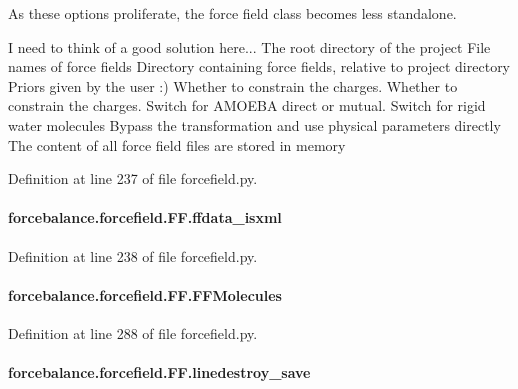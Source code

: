 As these options proliferate, the force field class becomes less standalone. 

I need to think of a good solution here... The root directory of the project File names of force fields Directory containing force fields, relative to project directory Priors given by the user \-:) Whether to constrain the charges. Whether to constrain the charges. Switch for A\-M\-O\-E\-B\-A direct or mutual. Switch for rigid water molecules Bypass the transformation and use physical parameters directly The content of all force field files are stored in memory 

Definition at line 237 of file forcefield.\-py.

\hypertarget{classforcebalance_1_1forcefield_1_1FF_af942210095e12b4995a64ca461cd5d76}{
\paragraph[{ffdata\-\_\-isxml}]{\setlength{\rightskip}{0pt plus 5cm}forcebalance.\-forcefield.\-F\-F.\-ffdata\-\_\-isxml}}\label{classforcebalance_1_1forcefield_1_1FF_af942210095e12b4995a64ca461cd5d76}


Definition at line 238 of file forcefield.\-py.

\hypertarget{classforcebalance_1_1forcefield_1_1FF_aa5ba15f51599b631b9be90cda847f1d9}{
\paragraph[{F\-F\-Molecules}]{\setlength{\rightskip}{0pt plus 5cm}forcebalance.\-forcefield.\-F\-F.\-F\-F\-Molecules}}\label{classforcebalance_1_1forcefield_1_1FF_aa5ba15f51599b631b9be90cda847f1d9}


Definition at line 288 of file forcefield.\-py.

\hypertarget{classforcebalance_1_1forcefield_1_1FF_aa4f1adc1fc16e922c98145553ac5b67f}{
\paragraph[{linedestroy\-\_\-save}]{\setlength{\rightskip}{0pt plus 5cm}forcebalance.\-forcefield.\-F\-F.\-linedestroy\-\_\-save}}\label{classforcebalance_1_1forcefield_1_1FF_aa4f1adc1fc16e922c98145553ac5b67f}


